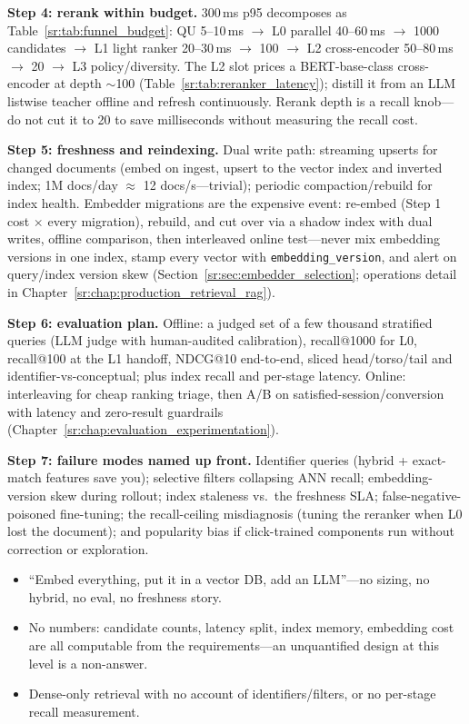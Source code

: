 \begin{interviewq}
\textbf{Step 4: rerank within budget.} 300\,ms p95 decomposes as Table~\ref{sr:tab:funnel_budget}: QU 5--10\,ms $\to$ L0 parallel 40--60\,ms $\to$ 1000 candidates $\to$ L1 light ranker 20--30\,ms $\to$ 100 $\to$ L2 cross-encoder 50--80\,ms $\to$ 20 $\to$ L3 policy/diversity. The L2 slot prices a BERT-base-class cross-encoder at depth $\sim$100 (Table~\ref{sr:tab:reranker_latency}); distill it from an LLM listwise teacher offline and refresh continuously. Rerank depth is a recall knob---do not cut it to 20 to save milliseconds without measuring the recall cost.

\textbf{Step 5: freshness and reindexing.} Dual write path: streaming upserts for changed documents (embed on ingest, upsert to the vector index and inverted index; 1M docs/day $\approx$ 12 docs/s---trivial); periodic compaction/rebuild for index health. Embedder migrations are the expensive event: re-embed (Step 1 cost $\times$ every migration), rebuild, and cut over via a shadow index with dual writes, offline comparison, then interleaved online test---never mix embedding versions in one index, stamp every vector with \texttt{embedding\_version}, and alert on query/index version skew (Section~\ref{sr:sec:embedder_selection}; operations detail in Chapter~\ref{sr:chap:production_retrieval_rag}).

\textbf{Step 6: evaluation plan.} Offline: a judged set of a few thousand stratified queries (LLM judge with human-audited calibration), recall@1000 for L0, recall@100 at the L1 handoff, NDCG@10 end-to-end, sliced head/torso/tail and identifier-vs-conceptual; plus index recall and per-stage latency. Online: interleaving for cheap ranking triage, then A/B on satisfied-session/conversion with latency and zero-result guardrails (Chapter~\ref{sr:chap:evaluation_experimentation}).

\textbf{Step 7: failure modes named up front.} Identifier queries (hybrid + exact-match features save you); selective filters collapsing ANN recall; embedding-version skew during rollout; index staleness vs.\ the freshness SLA; false-negative-poisoned fine-tuning; the recall-ceiling misdiagnosis (tuning the reranker when L0 lost the document); and popularity bias if click-trained components run without correction or exploration.

\redflags
\begin{itemize}
    \item ``Embed everything, put it in a vector DB, add an LLM''---no sizing, no hybrid, no eval, no freshness story.
    \item No numbers: candidate counts, latency split, index memory, embedding cost are all computable from the requirements---an unquantified design at this level is a non-answer.
    \item Dense-only retrieval with no account of identifiers/filters, or no per-stage recall measurement.
\end{itemize}


\end{interviewq}
